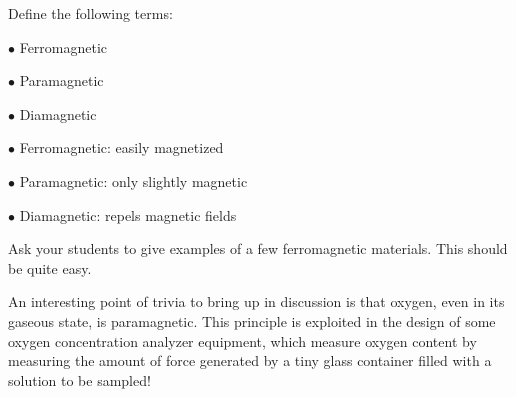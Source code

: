 

Define the following terms:

\medskip
\item{$\bullet$} Ferromagnetic
\item{$\bullet$} Paramagnetic
\item{$\bullet$} Diamagnetic
\medskip







\medskip
\item{$\bullet$} Ferromagnetic: easily magnetized
\item{$\bullet$} Paramagnetic: only slightly magnetic
\item{$\bullet$} Diamagnetic: repels magnetic fields
\medskip







Ask your students to give examples of a few ferromagnetic materials.  This should be quite easy.

\vskip 10pt

An interesting point of trivia to bring up in discussion is that oxygen, even in its gaseous state, is paramagnetic.  This principle is exploited in the design of some oxygen concentration analyzer equipment, which measure oxygen content by measuring the amount of force generated by a tiny glass container filled with a solution to be sampled!




